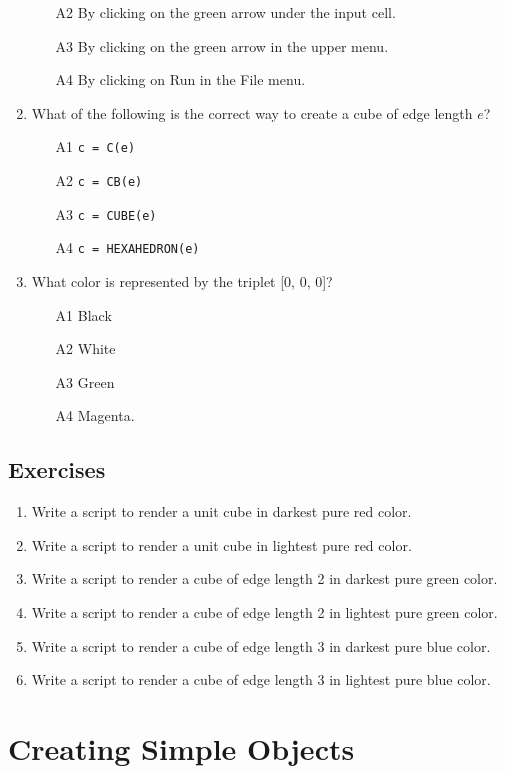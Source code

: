 \documentclass{article}
\begin{document}
\begin{enumerate}
\begin{itemize}
\item[A2] By clicking on the green arrow under the input cell.
\item[A3] By clicking on the green arrow in the upper menu.
\item[A4] By clicking on Run in the File menu.
\end{itemize}
\item What of the following is the correct way to create a cube of edge length $e$?
\begin{itemize}
\item[A1] {\tt c = C(e)}
\item[A2] {\tt c = CB(e)}
\item[A3] {\tt c = CUBE(e)}
\item[A4] {\tt c = HEXAHEDRON(e)}
\end{itemize}
\item What color is represented by the triplet [0, 0, 0]?
\begin{itemize}
\item[A1] Black
\item[A2] White
\item[A3] Green
\item[A4] Magenta.
\end{itemize}
\end{enumerate}

\subsection{Exercises}

\begin{enumerate}
\item Write a script to render a unit cube in darkest pure red color.
\item Write a script to render a unit cube in lightest pure red color.
\item Write a script to render a cube of edge length 2 in darkest pure green color.
\item Write a script to render a cube of edge length 2 in lightest pure green color.
\item Write a script to render a cube of edge length 3 in darkest pure blue color.
\item Write a script to render a cube of edge length 3 in lightest pure blue color.
\end{enumerate}

\section{Creating Simple Objects}
\end{document}
